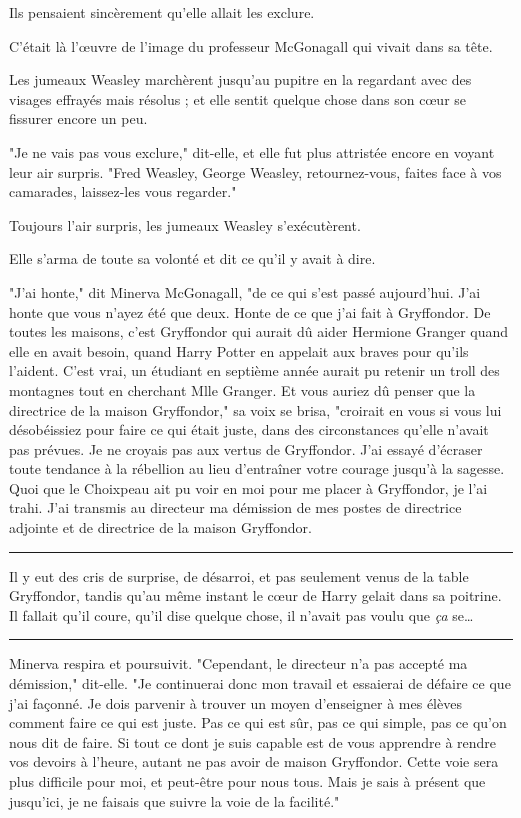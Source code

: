 Ils pensaient sincèrement qu'elle allait les exclure.

C'était là l'œuvre de l'image du professeur McGonagall qui vivait dans sa tête.

Les jumeaux Weasley marchèrent jusqu'au pupitre en la regardant avec des visages effrayés mais résolus ; et elle sentit quelque chose dans son cœur se fissurer encore un peu.

"Je ne vais pas vous exclure," dit-elle, et elle fut plus attristée encore en voyant leur air surpris. "Fred Weasley, George Weasley, retournez-vous, faites face à vos camarades, laissez-les vous regarder."

Toujours l'air surpris, les jumeaux Weasley s'exécutèrent.

Elle s'arma de toute sa volonté et dit ce qu'il y avait à dire.

"J'ai honte," dit Minerva McGonagall, "de ce qui s'est passé aujourd'hui. J'ai honte que vous n'ayez été que deux. Honte de ce que j'ai fait à Gryffondor. De toutes les maisons, c'est Gryffondor qui aurait dû aider Hermione Granger quand elle en avait besoin, quand Harry Potter en appelait aux braves pour qu'ils l'aident. C'est vrai, un étudiant en septième année aurait pu retenir un troll des montagnes tout en cherchant Mlle Granger. Et vous auriez dû penser que la directrice de la maison Gryffondor," sa voix se brisa, "croirait en vous si vous lui désobéissiez pour faire ce qui était juste, dans des circonstances qu'elle n'avait pas prévues. Je ne croyais pas aux vertus de Gryffondor. J'ai essayé d'écraser toute tendance à la rébellion au lieu d'entraîner votre courage jusqu'à la sagesse. Quoi que le Choixpeau ait pu voir en moi pour me placer à Gryffondor, je l'ai trahi. J'ai transmis au directeur ma démission de mes postes de directrice adjointe et de directrice de la maison Gryffondor.
\par\noindent\rule{\textwidth}{0.4pt}
Il y eut des cris de surprise, de désarroi, et pas seulement venus de la table Gryffondor, tandis qu'au même instant le cœur de Harry gelait dans sa poitrine. Il fallait qu'il coure, qu'il dise quelque chose, il n'avait pas voulu que \emph{ça}  se…
\par\noindent\rule{\textwidth}{0.4pt}
Minerva respira et poursuivit. "Cependant, le directeur n'a pas accepté ma démission," dit-elle. "Je continuerai donc mon travail et essaierai de défaire ce que j'ai façonné. Je dois parvenir à trouver un moyen d'enseigner à mes élèves comment faire ce qui est juste. Pas ce qui est sûr, pas ce qui simple, pas ce qu'on nous dit de faire. Si tout ce dont je suis capable est de vous apprendre à rendre vos devoirs à l'heure, autant ne pas avoir de maison Gryffondor. Cette voie sera plus difficile pour moi, et peut-être pour nous tous. Mais je sais à présent que jusqu'ici, je ne faisais que suivre la voie de la facilité."

